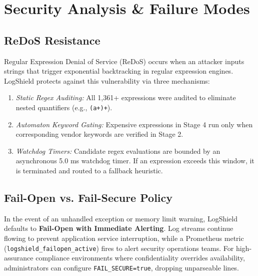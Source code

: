 \documentclass[conference]{IEEEtran}
\begin{document}
\section{Security Analysis \& Failure Modes}

\subsection{ReDoS Resistance}
Regular Expression Denial of Service (ReDoS) occurs when an attacker inputs strings that trigger exponential backtracking in regular expression engines. LogShield protects against this vulnerability via three mechanisms:
\begin{enumerate}
    \item \textit{Static Regex Auditing:} All 1,361+ expressions were audited to eliminate nested quantifiers (e.g., \texttt{(a+)+}).
    \item \textit{Automaton Keyword Gating:} Expensive expressions in Stage 4 run only when corresponding vendor keywords are verified in Stage 2.
    \item \textit{Watchdog Timers:} Candidate regex evaluations are bounded by an asynchronous 5.0 ms watchdog timer. If an expression exceeds this window, it is terminated and routed to a fallback heuristic.
\end{enumerate}

\subsection{Fail-Open vs. Fail-Secure Policy}
In the event of an unhandled exception or memory limit warning, LogShield defaults to \textbf{Fail-Open with Immediate Alerting}. Log streams continue flowing to prevent application service interruption, while a Prometheus metric (\texttt{logshield\_failopen\_active}) fires to alert security operations teams. For high-assurance compliance environments where confidentiality overrides availability, administrators can configure \texttt{FAIL\_SECURE=true}, dropping unparseable lines.
\end{document}
